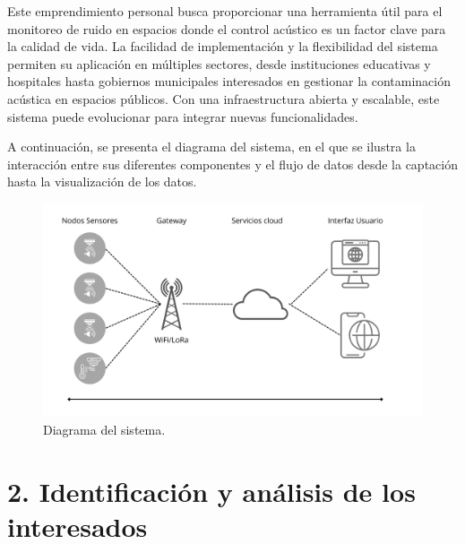 \documentclass[
11pt, %
]{charter}
\begin{document}
 Este emprendimiento personal busca proporcionar una herramienta útil para el monitoreo de ruido en espacios donde el control 
 acústico es un factor clave para la calidad de vida. La facilidad de implementación y la flexibilidad del sistema permiten 
 su aplicación en múltiples sectores, desde instituciones educativas y hospitales hasta gobiernos municipales interesados en 
 gestionar la contaminación acústica en espacios públicos. Con una infraestructura abierta y escalable, este sistema puede 
 evolucionar para integrar nuevas funcionalidades.

 A continuación, se presenta el diagrama del sistema, en el que se ilustra la interacción entre sus diferentes componentes y el 
 flujo de datos desde la captación hasta la visualización de los datos.


\begin{figure}[htpb]
	\centering 
	\includegraphics[width=.65\textwidth]{./Figuras/diagramaSist.png}
	\caption{Diagrama del sistema.}
	\label{fig:diagBloques}
	\end{figure}
	
	\vspace{25px}

\section{2. Identificación y análisis de los interesados}
\label{sec:interesados}
\end{document}

